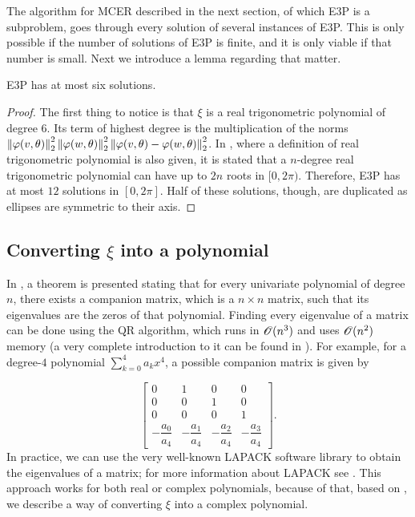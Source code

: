 The algorithm for MCER described in the next section, of which E3P is a subproblem, goes through every solution of several instances of E3P. This is only possible if the number of solutions of E3P is finite, and it is only viable if that number is small. Next we introduce a lemma regarding that matter.

\begin{lem}\label{lema:e3p}
	E3P has at most six solutions.
\end{lem}

\begin{proof}
	The first thing to notice is that $\xi$ is a real trigonometric polynomial of degree $6$. 
	Its term of highest degree is the multiplication of the norms $\left\lVert\varphi(v, \theta)\right\rVert_{2}^2\left\lVert\varphi(w, \theta)\right\rVert_{2}^2\left\lVert\varphi(v, \theta)-\varphi(w, \theta)\right\rVert_{2}^2$. In \cite[p.~150]{powell}, where a definition of real trigonometric polynomial is also given, it is stated that a $n$-degree real trigonometric polynomial can have up to $2n$ roots in $[0, 2\pi)$. Therefore, E3P has at most $12$ solutions in $[0, 2\pi]$.
	Half of these solutions, though, are duplicated as ellipses are symmetric to their axis.
\end{proof}

\subsection{Converting $\xi$ into a polynomial}

In \cite[p.~195]{horn}, a theorem is presented stating that for every univariate polynomial of degree $n$, there exists a companion matrix, which is a $n\times n$ matrix, such that its eigenvalues are the zeros of that polynomial. Finding every eigenvalue of a matrix can be done using the QR algorithm, which runs in $\mathscr{O}(n^3)$ and uses $\mathscr{O}(n^2)$ memory (a very complete introduction to it can be found in \cite{watkins:2008}). For example, for a degree-$4$ polynomial $\sum_{k=0}^4 a_k x^4$, a possible companion matrix is given by

 \begin{equation*}
\left[\begin{array}{ccccc}
0 & 1 & 0 & 0\\
0 & 0 & 1 & 0\\
0 & 0 & 0 & 1\\
-\dfrac{a_0}{a_4} & -\dfrac{a_1}{a_4} & -\dfrac{a_2}{a_4} & -\dfrac{a_3}{a_4}
\end{array}\right].
\end{equation*}
In practice, we can use the very well-known LAPACK software library to obtain the eigenvalues of a matrix; for more information about LAPACK see \cite{lapack}.
This approach works for both real or complex polynomials, because of that, based on \cite{weidner}, we describe a way of converting $\xi$ into a complex polynomial.

